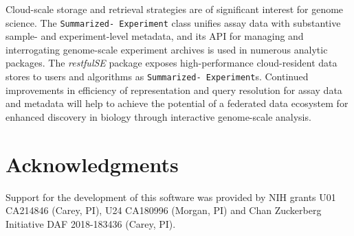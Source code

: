 \documentclass[9pt,a4paper,]{extarticle}
\begin{document}
Cloud-scale storage and retrieval strategies are of significant
interest for genome science.
The \texttt{Summarized- Experiment} class
unifies assay data with substantive sample- and experiment-level
metadata, and its API for managing and interrogating
genome-scale experiment archives is used in numerous
analytic packages.
The \textit{restfulSE} package exposes high-performance
cloud-resident data stores to users and
algorithms as \texttt{Summarized- Experiment}s. Continued improvements
in efficiency of
representation and query resolution for assay data and metadata
will help to achieve the potential of a federated data ecosystem for
enhanced discovery in biology through interactive genome-scale analysis.

\section{Acknowledgments}\label{acknowledgments}

Support for the development of this software was provided by NIH grants
U01 CA214846 (Carey, PI), U24 CA180996 (Morgan, PI) and
Chan Zuckerberg Initiative DAF 2018-183436 (Carey, PI).

{\small}
\end{document}
